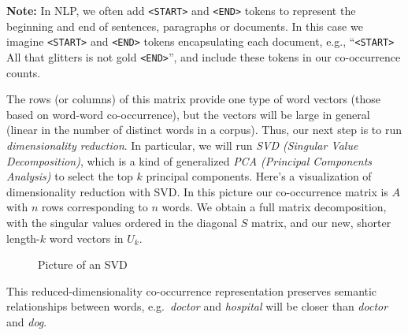 \documentclass[11pt]{article}
\begin{document}
\textbf{Note:} In NLP, we often add
\texttt{\textless{}START\textgreater{}} and
\texttt{\textless{}END\textgreater{}} tokens to represent the beginning
and end of sentences, paragraphs or documents. In this case we imagine
\texttt{\textless{}START\textgreater{}} and
\texttt{\textless{}END\textgreater{}} tokens encapsulating each
document, e.g., ``\texttt{\textless{}START\textgreater{}} All that
glitters is not gold \texttt{\textless{}END\textgreater{}}'', and
include these tokens in our co-occurrence counts.

The rows (or columns) of this matrix provide one type of word vectors
(those based on word-word co-occurrence), but the vectors will be large
in general (linear in the number of distinct words in a corpus). Thus,
our next step is to run \emph{dimensionality reduction}. In particular,
we will run \emph{SVD (Singular Value Decomposition)}, which is a kind
of generalized \emph{PCA (Principal Components Analysis)} to select the
top \(k\) principal components. Here's a visualization of dimensionality
reduction with SVD. In this picture our co-occurrence matrix is \(A\)
with \(n\) rows corresponding to \(n\) words. We obtain a full matrix
decomposition, with the singular values ordered in the diagonal \(S\)
matrix, and our new, shorter length-\(k\) word vectors in \(U_k\).

\begin{figure}
    \centering
    \caption{Picture of an SVD}
\end{figure}

This reduced-dimensionality co-occurrence representation preserves
semantic relationships between words, e.g.~\emph{doctor} and
\emph{hospital} will be closer than \emph{doctor} and \emph{dog}.
\end{document}
